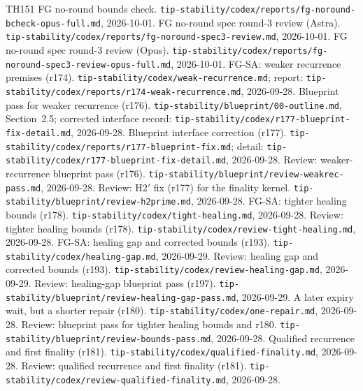 \documentclass{article}
\theoremstyle{plain}
\theoremstyle{definition}
\theoremstyle{remark}
\begin{document}
\begin{thebibliography}{TH151}
  FG no-round bounds check.
  \nolinkurl{tip-stability/codex/reports/fg-noround-bcheck-opus-full.md}, 2026-10-01.
  FG no-round spec round-3 review (Astra).
  \nolinkurl{tip-stability/codex/reports/fg-noround-spec3-review.md}, 2026-10-01.
  FG no-round spec round-3 review (Opus).
  \nolinkurl{tip-stability/codex/reports/fg-noround-spec3-review-opus-full.md}, 2026-10-01.
  FG-SA: weaker recurrence premises (r174).
  \nolinkurl{tip-stability/codex/weak-recurrence.md}; report:
  \nolinkurl{tip-stability/codex/reports/r174-weak-recurrence.md}, 2026-09-28.
  Blueprint pass for weaker recurrence (r176).
  \nolinkurl{tip-stability/blueprint/00-outline.md}, Section~2.5;
  corrected interface record:
  \nolinkurl{tip-stability/codex/r177-blueprint-fix-detail.md}, 2026-09-28.
  Blueprint interface correction (r177).
  \nolinkurl{tip-stability/codex/reports/r177-blueprint-fix.md}; detail:
  \nolinkurl{tip-stability/codex/r177-blueprint-fix-detail.md}, 2026-09-28.
  Review: weaker-recurrence blueprint pass (r176).
  \nolinkurl{tip-stability/blueprint/review-weakrec-pass.md}, 2026-09-28.
  Review: H2$'$ fix (r177) for the finality kernel.
  \nolinkurl{tip-stability/blueprint/review-h2prime.md}, 2026-09-28.
  FG-SA: tighter healing bounds (r178).
  \nolinkurl{tip-stability/codex/tight-healing.md}, 2026-09-28.
  Review: tighter healing bounds (r178).
  \nolinkurl{tip-stability/codex/review-tight-healing.md}, 2026-09-28.
  FG-SA: healing gap and corrected bounds (r193).
  \nolinkurl{tip-stability/codex/healing-gap.md}, 2026-09-29.
  Review: healing gap and corrected bounds (r193).
  \nolinkurl{tip-stability/codex/review-healing-gap.md}, 2026-09-29.
  Review: healing-gap blueprint pass (r197).
  \nolinkurl{tip-stability/blueprint/review-healing-gap-pass.md}, 2026-09-29.
  A later expiry wait, but a shorter repair (r180).
  \nolinkurl{tip-stability/codex/one-repair.md}, 2026-09-28.
  Review: blueprint pass for tighter healing bounds and r180.
  \nolinkurl{tip-stability/blueprint/review-bounds-pass.md}, 2026-09-28.
  Qualified recurrence and first finality (r181).
  \nolinkurl{tip-stability/codex/qualified-finality.md}, 2026-09-28.
  Review: qualified recurrence and first finality (r181).
  \nolinkurl{tip-stability/codex/review-qualified-finality.md}, 2026-09-28.

\end{thebibliography}
\end{document}
